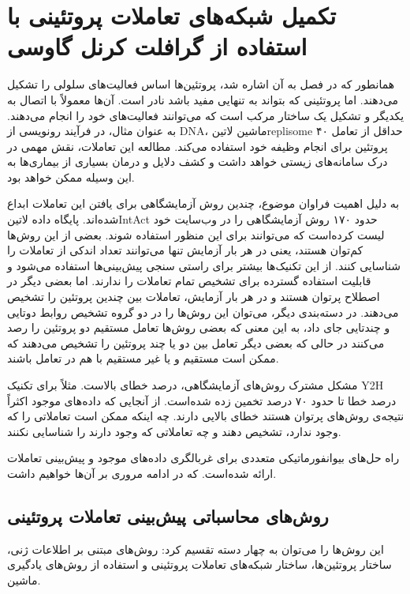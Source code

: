 \chapter{تکمیل شبکه‌های تعاملات پروتئینی با استفاده از گرافلت کرنل گاوسی}\label{chap:network-completion-problem-ppi}
همانطور که در فصل  به آن اشاره شد، پروتئین‌ها اساس فعالیت‌های سلولی را تشکیل می‌دهند. اما پروتئینی که بتواند به تنهایی مفید باشد نادر است. آن‌ها معمولاً با اتصال به یکدیگر و تشکیل یک ساختار مرکب است که می‌توانند فعالیت‌های خود را انجام می‌دهند. به عنوان مثال، در فرآیند رونویسی از DNA، ماشین ‌لاتین{replisome} حداقل از تعامل ۴۰ پروتئین برای انجام وظیفه خود استفاده می‌کند. مطالعه این تعاملات، نقش مهمی در درک سامانه‌های زیستی خواهد داشت و کشف دلایل و درمان بسیاری از بیماری‌ها به این وسیله ممکن خواهد بود.

به دلیل اهمیت فراوان موضوع، چندین روش آزمایشگاهی برای یافتن این تعاملات ابداع شده‌اند. پایگاه داده ‌لاتین{IntAct} حدود ۱۷۰ روش آزمایشگاهی را در وب‌سایت خود لیست کرده‌است که می‌توانند برای این منظور استفاده شوند. بعضی از این روش‌ها کم‌توان هستند، یعنی در هر بار آزمایش تنها می‌توانند تعداد اندکی از تعاملات را شناسایی کنند. از این تکنیک‌ها بیشتر برای راستی سنجی پیش‌بینی‌ها استفاده می‌شود و قابلیت استفاده گسترده برای تشخیص تمام تعاملات را ندارند. اما بعضی دیگر در اصطلاح پر‌توان هستند و در هر بار آزمایش، تعاملات بین چندین پروتئین را تشخیص می‌دهند. در دسته‌بندی دیگر، می‌توان این روش‌ها را در دو گروه تشخیص روابط دوتایی و چندتایی جای داد، به این معنی که بعضی روش‌ها تعامل مستقیم دو پروتئین را رصد می‌کنند در حالی که بعضی دیگر تعامل بین دو یا چند پروتئین را تشخیص می‌دهند که ممکن است مستقیم و یا غیر مستقیم با هم در تعامل باشند.

مشکل مشترک روش‌های آزمایشگاهی، درصد خطای بالاست. مثلاً برای تکنیک Y2H درصد خطا تا حدود ۷۰ درصد تخمین زده شده‌است. از آنجایی که داده‌های موجود اکثراً نتیجه‌ی روش‌های پرتوان هستند خطای بالایی دارند. چه اینکه ممکن است تعاملاتی را که وجود ندارد، تشخیص دهند و چه تعاملاتی که وجود دارند را شناسایی نکنند.

راه حل‌های بیوانفورماتیکی متعددی برای غربالگری داده‌های موجود و پیش‌بینی تعاملات ارائه شده‌است. که در ادامه مروری بر آن‌ها خواهیم داشت.

\section{روش‌های محاسباتی پیش‌بینی تعاملات پروتئینی}
این روش‌ها را می‌توان به چهار دسته تقسیم کرد: روش‌های مبتنی بر اطلاعات ژنی، ساختار پروتئین‌ها، ساختار شبکه‌های تعاملات پروتئینی و استفاده از روش‌های یادگیری ماشین.

